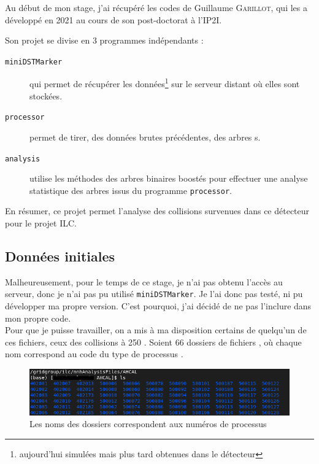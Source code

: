 Au début de mon stage, j'ai récupéré les codes de Guillaume \textsc{Garillot}, qui les a développé en 2021 au cours de son post-doctorat à l'IP2I. 

Son projet se divise en 3 programmes indépendants \Figure{\ref{orga:init}} :

\begin{description}
	
	\item[\texttt{miniDSTMarker}] qui permet de récupérer les données\footnote{aujourd'hui simulées mais plus tard obtenues dans le détecteur} sur le serveur distant où elles sont stockées.
	
	\item[\texttt{processor}] permet de tirer, des données brutes précédentes, des arbres \ROOT s.
	
	\item[\texttt{analysis}] utilise les méthodes des arbres binaires boostés pour effectuer une analyse statistique des arbres \ROOT issus du programme \texttt{processor}.
	
\end{description} 



En résumer, ce projet permet l'analyse des collisions survenues dans ce détecteur pour le projet ILC.


\subsection{Données initiales}


Malheureusement, pour le temps de ce stage, je n'ai pas obtenu l'accès au serveur, donc je n'ai pas pu utilisé \texttt{miniDSTMarker}. Je l'ai donc pas testé, ni pu développer ma propre version. C'est pourquoi, j'ai décidé de ne pas l'inclure dans mon propre code.\\

Pour que je puisse travailler, on a mis à ma disposition certains de quelqu'un de ces fichiers, ceux des collisions à 250 \GeV. Soient 66 dossiers \Figure{\ref{data:list}} de fichiers \LCIO, où chaque nom correspond au code du type de processus \Figure{\ref{data:def}}.

\begin{figure}[h!]
	\includegraphics[width=\textwidth]{../img/listeProcessus.png} 
	\caption{Les noms des dossiers correspondent aux numéros de processus}
	\label{data:list}
\end{figure}


